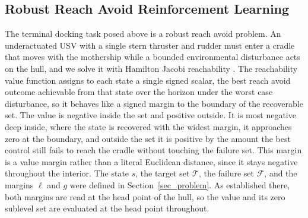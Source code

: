 \documentclass[5p,times,authoryear]{elsarticle}
\begin{document}
\subsection{Robust Reach Avoid Reinforcement Learning}\label{sec_rl}
The terminal docking task posed above is a robust reach avoid problem. An underactuated USV with a single stern thruster and rudder must enter a cradle that moves with the mothership while a bounded environmental disturbance acts on the hull, and we solve it with Hamilton Jacobi reachability \citep{mitchell2005time, bansal2017hamilton, lygeros2004reachability}. The reachability value function assigns to each state a single signed scalar, the best reach avoid outcome achievable from that state over the horizon under the worst case disturbance, so it behaves like a signed margin to the boundary of the recoverable set. The value is negative inside the set and positive outside. It is most negative deep inside, where the state is recovered with the widest margin, it approaches zero at the boundary, and outside the set it is positive by the amount the best control still fails to reach the cradle without touching the failure set. This margin is a value margin rather than a literal Euclidean distance, since it stays negative throughout the interior. The state $s$, the target set $\mathcal{T}$, the failure set $\mathcal{F}$, and the margins $\ell$ and $g$ were defined in Section~\ref{sec_problem}. As established there, both margins are read at the head point of the hull, so the value and its zero sublevel set are evaluated at the head point throughout.
\end{document}
